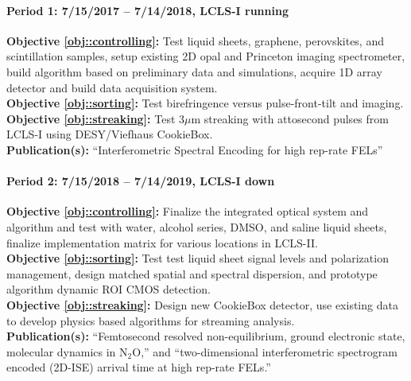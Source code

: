 \documentclass[letterpaper,oneside,11pt]{article}
\begin{document}
\paragraph*{Period 1: 7/15/2017 -- 7/14/2018, LCLS-I running\\}
\textbf{Objective \ref{obj::controlling}: } 
Test liquid sheets, graphene, perovskites, and scintillation samples, setup existing 2D opal and Princeton imaging spectrometer, build algorithm based on preliminary data and simulations, acquire 1D array detector and build data acquisition system.\\
\textbf{Objective \ref{obj::sorting}: }
Test birefringence versus pulse-front-tilt and imaging.\\
\textbf{Objective \ref{obj::streaking}: }
Test 3$\mu$m streaking with attosecond pulses from LCLS-I using DESY/Viefhaus CookieBox.\\
\textbf{Publication(s): }
``Interferometric Spectral Encoding for high rep-rate FELs''

\paragraph*{Period 2: 7/15/2018 -- 7/14/2019, LCLS-I down\\}
\textbf{Objective \ref{obj::controlling}: } 
Finalize the integrated optical system and algorithm and test with water, alcohol series, DMSO, and saline liquid sheets, finalize implementation matrix for various locations in LCLS-II.\\
\textbf{Objective \ref{obj::sorting}: }
Test test liquid sheet signal levels and polarization management, design matched spatial and spectral dispersion, and prototype algorithm dynamic ROI CMOS detection.\\
\textbf{Objective \ref{obj::streaking}: }
Design new CookieBox detector, use existing data to develop physics based algorithms for streaming analysis.\\
\textbf{Publication(s): }
``Femtosecond resolved non-equilibrium, ground electronic state, molecular dynamics in N$_2$O,'' and ``two-dimensional interferometric spectrogram encoded (2D-ISE) arrival time at high rep-rate FELs.''
\end{document}
